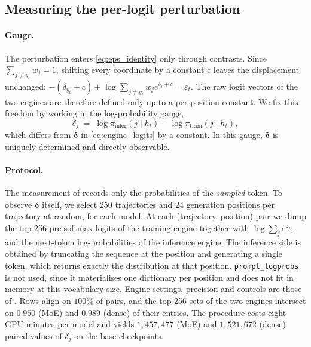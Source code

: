 \subsection{Measuring the per-logit perturbation}
\label{app:mm-measure}

\paragraph{Gauge.}
The perturbation enters \eqref{eq:eps_identity} only through contrasts. Since
$\sum_{j\neq y_t}w_j=1$, shifting every coordinate by a constant $c$ leaves
the displacement unchanged:
$-(\delta_{y_t}+c)+\log\sum_{j\neq y_t}w_je^{\delta_j+c}=\varepsilon_t$.
The raw logit vectors of the two engines are therefore defined only up to a
per-position constant. We fix this freedom by working in the log-probability
gauge,
\begin{equation}
\delta_j\;=\;\log\pi_{\mathrm{infer}}(j\mid h_t)-\log\pi_{\mathrm{train}}(j\mid h_t),
\label{eq:delta_gauge}
\end{equation}
which differs from $\boldsymbol\delta$ in \eqref{eq:engine_logits} by a
constant. In this gauge, $\boldsymbol\delta$ is uniquely determined and
directly observable.

\paragraph{Protocol.}
The measurement of  records only the probabilities of the
\emph{sampled} token. To observe $\boldsymbol\delta$ itself, we select 250
trajectories and 24 generation positions per trajectory at random, for each
model. At each (trajectory, position) pair we dump the top-256 pre-softmax
logits of the training engine together with $\log\sum_je^{z_j}$, and the
next-token log-probabilities of the inference engine. The inference side is
obtained by truncating the sequence at the position and generating a single
token, which returns exactly the distribution at that position.
\texttt{prompt\_logprobs} is not used, since it materialises one dictionary per
position and does not fit in memory at this vocabulary size. Engine settings,
precision and controls are those of . Rows align on
$100\%$ of pairs, and the top-256 sets of the two engines intersect on $0.950$
(MoE) and $0.989$ (dense) of their entries. The procedure costs eight
GPU-minutes per model and yields $1{,}457{,}477$ (MoE) and $1{,}521{,}672$
(dense) paired values of $\delta_j$ on the base checkpoints.

